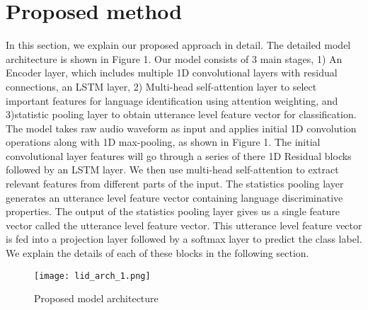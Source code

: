 \documentclass{article}
\begin{document}
\section{Proposed method}
In this section, we explain our proposed approach in detail. The detailed model architecture is shown in Figure 1. Our model consists of 3 main stages, 1) An Encoder layer, which includes multiple 1D convolutional layers with residual connections, an LSTM layer, 2) Multi-head self-attention layer to select important features for language identification using attention weighting, and 3)statistic pooling layer to obtain utterance level feature vector for classification. The model takes raw audio waveform as input and applies initial 1D convolution operations along with 1D max-pooling, as shown in Figure 1. The initial convolutional layer features will go through a series of there 1D Residual blocks followed by an LSTM layer. We then use multi-head self-attention to extract relevant features from different parts of the input. The statistics pooling layer generates an utterance level feature vector containing language discriminative properties. The output of the statistics pooling layer gives us a single feature vector called the utterance level feature vector. This utterance level feature vector is fed into a projection layer followed by a softmax layer to predict the class label. We explain the details of each of these blocks in the following section.

\begin{figure}[!htbp]
  \centering
  \texttt{[image: lid\_arch\_1.png]}
  \caption{Proposed model architecture}
    \label{fig:tree-net}
  \endminipage\hfill
\end{figure}
\end{document}
